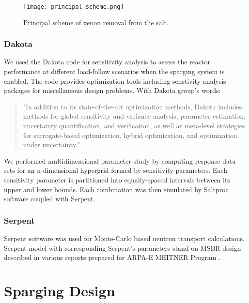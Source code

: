     \begin{figure}[h]
        \begin{center}
            \texttt{[image: principal\_scheme.png]}
        \end{center}
        \caption{Principal scheme of xenon removal from the salt.}
        \label{fig:scheme}
    \end{figure}

\subsubsection{Dakota}

    We used the Dakota code \cite{adams_dakota_2019} for sensitivity analysis to
    assess the reactor performance at different load-follow scenarios when the sparging system is enabled. The code provides optimization tools including senstivity analysis packages for miscellaneous design problems. With Dakota group's words:

    \begin{quote}
        "In addition to its state-of-the-art optimization methods, Dakota
        includes methods for global sensitivity and variance analysis, parameter
        estimation, uncertainty quantification, and verification, as well as
        meta-level strategies for surrogate-based optimization, hybrid
        optimization, and optimization under uncertainty."
    \end{quote}

    We performed multidimensional parameter study by computing response data sets for an n-dimensional hypergrid formed by sensitivity parameters. Each sensitivity parameter is partitioned into equally-spaced intervals between its upper and lower bounds. Each combination was then simulated by Saltproc software coupled with Serpent.

\subsubsection{Serpent}

    Serpent software \cite{Lep2014} was used for Monte-Carlo based neutron transport calculations. Serpent model with corresponding Serpent's parameters stand on MSBR design described in various reports prepared for ARPA-E MEITNER Program \cite{rykhlevskii_fuel_2019, rykhlevskii_modeling_2019, rykhlevskii_fuel_2020}.

\newpage
\FloatBarrier

\section{Sparging Design}

